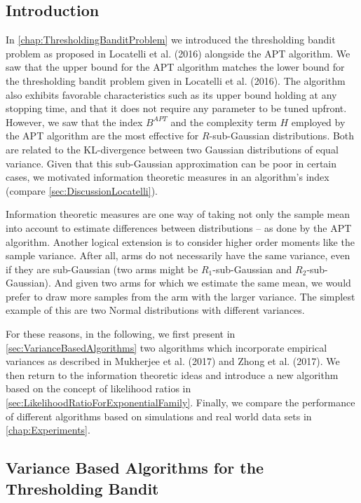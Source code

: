 \documentclass[11pt,]{article}
\begin{document}
\subsection{\texorpdfstring{Introduction
\label{sec:ExtensionsIntroduction}}{Introduction }}\label{introduction-1}

In \autoref{chap:ThresholdingBanditProblem} we introduced the
thresholding bandit problem as proposed in Locatelli et al. (2016)
alongside the APT algorithm. We saw that the upper bound for the APT
algorithm matches the lower bound for the thresholding bandit problem
given in Locatelli et al. (2016). The algorithm also exhibits favorable
characteristics such as its upper bound holding at any stopping time,
and that it does not require any parameter to be tuned upfront. However,
we saw that the index \(B^{APT}\) and the complexity term \(H\) employed
by the APT algorithm are the most effective for \(R\)-sub-Gaussian
distributions. Both are related to the KL-divergence between two
Gaussian distributions of equal variance. Given that this sub-Gaussian
approximation can be poor in certain cases, we motivated information
theoretic measures in an algorithm's index (compare
\autoref{sec:DiscussionLocatelli}).

Information theoretic measures are one way of taking not only the sample
mean into account to estimate differences between distributions -- as
done by the APT algorithm. Another logical extension is to consider
higher order moments like the sample variance. After all, arms do not
necessarily have the same variance, even if they are sub-Gaussian (two
arms might be \(R_1\)-sub-Gaussian and \(R_2\)-sub-Gaussian). And given
two arms for which we estimate the same mean, we would prefer to draw
more samples from the arm with the larger variance. The simplest example
of this are two Normal distributions with different variances.

For these reasons, in the following, we first present in
\autoref{sec:VarianceBasedAlgorithms} two algorithms which incorporate
empirical variances as described in Mukherjee et al. (2017) and Zhong et
al. (2017). We then return to the information theoretic ideas and
introduce a new algorithm based on the concept of likelihood ratios in
\autoref{sec:LikelihoodRatioForExponentialFamily}. Finally, we compare
the performance of different algorithms based on simulations and real
world data sets in \autoref{chap:Experiments}.

\subsection{\texorpdfstring{Variance Based Algorithms for the
Thresholding Bandit
\label{sec:VarianceBasedAlgorithms}}{Variance Based Algorithms for the Thresholding Bandit }}\label{variance-based-algorithms-for-the-thresholding-bandit}
\end{document}
